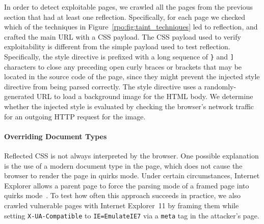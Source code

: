 In order to detect exploitable pages, we crawled all the pages from the previous
section that had at least one reflection. Specifically, for each page we checked
which of the techniques in Figure~\ref{rpo:fig:taint_techniques} led to
reflection, and crafted the main URL with a CSS payload. The CSS payload used to
verify exploitability is different from the simple payload used to test
reflection. Specifically, the style directive is prefixed with a long sequence
of \texttt{\}} and \texttt{]} characters to close any preceding open curly
braces or brackets that may be located in the source code of the page, since
they might prevent the injected style directive from being parsed correctly. The
style directive uses a randomly-generated URL to load a background image for the
HTML body. We determine whether the injected style is evaluated by checking the
browser's network traffic for an outgoing HTTP request for the image.

\paragraph{Overriding Document Types}

Reflected CSS is not always interpreted by the browser. One possible explanation
is the use of a modern document type in the page, which does not cause the
browser to render the page in quirks mode. Under certain circumstances, Internet
Explorer allows a parent page to force the parsing mode of a framed page into
quirks mode~\cite{prssi}. To test how often this approach succeeds in practice,
we also crawled vulnerable pages with Internet Explorer~11 by framing them while
setting \texttt{X-UA-Compatible} to \texttt{IE=EmulateIE7} via a \texttt{meta}
tag in the attacker's page.
